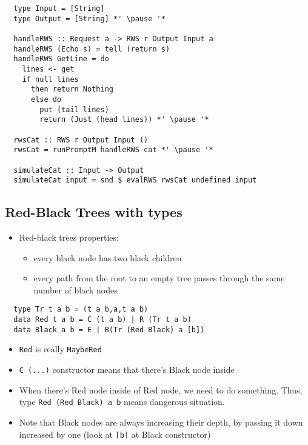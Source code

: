\documentclass[aspectratio=43]{beamer}
\begin{document}
\begin{frame}[fragile]
 \begin{lstlisting}
  type Input = [String]
  type Output = [String] *' \pause '*

  handleRWS :: Request a -> RWS r Output Input a
  handleRWS (Echo s) = tell (return s)
  handleRWS GetLine = do
    lines <- get
    if null lines
      then return Nothing
      else do
        put (tail lines)
        return (Just (head lines)) *' \pause '*
  
  rwsCat :: RWS r Output Input ()
  rwsCat = runPromptM handleRWS cat *' \pause '*
  
  simulateCat :: Input -> Output
  simulateCat input = snd $ evalRWS rwsCat undefined input
 \end{lstlisting}
\end{frame}

\subsection{Red-Black Trees with types}

\begin{frame}
 \begin{itemize}
  \item Red-black trees properties:
  \begin{itemize}
    \item every black node has two black children
    \item every path from the root to an empty tree passes through the same number of black nodes
  \end{itemize}
 \end{itemize}
\end{frame}

\begin{frame}[fragile]
 \begin{lstlisting}
  type Tr t a b = (t a b,a,t a b)
  data Red t a b = C (t a b) | R (Tr t a b)
  data Black a b = E | B(Tr (Red Black) a [b])
 \end{lstlisting}
 \pause
 \begin{itemize}
  \item \texttt{Red} is really \texttt{MaybeRed}
  \pause
  \item \texttt{C (...)} constructor means that there's Black node inside
  \pause
  \item When there's Red node inside of Red node, we need to do something. Thus, type \texttt{Red (Red Black) a b} means dangerous situation.
  \pause
  \item Note that Black nodes are always increasing their depth, by passing it down increased by one (look at \texttt{[b]} at Black constructor)
 \end{itemize}
\end{frame}
\end{document}
